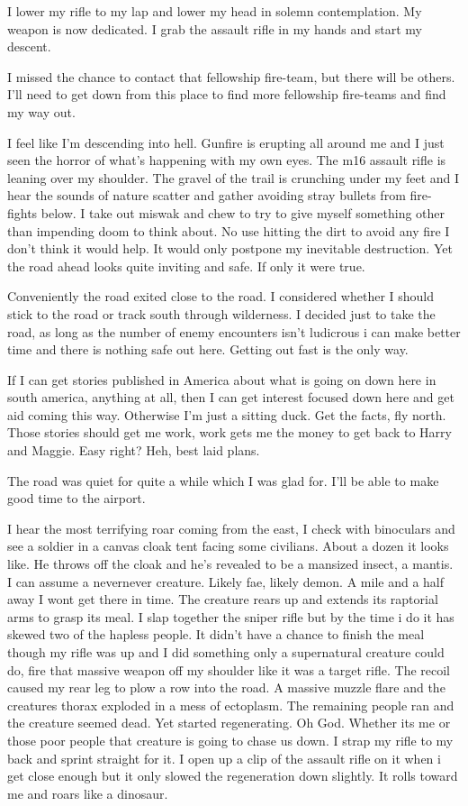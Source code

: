 I lower my rifle to my lap and lower my head in solemn contemplation. My weapon is now dedicated. I grab the assault rifle in my hands and start my descent.

I missed the chance to contact that fellowship fire-team, but there will be others. 
I'll need to get down from this place to find more fellowship fire-teams and find my way out.

I feel like I'm descending into hell. Gunfire is erupting all around me and I just seen the horror of what's happening with my own eyes. The m16 assault rifle is leaning over my shoulder. The gravel of the trail is crunching under my feet and I hear the sounds of nature scatter and gather avoiding stray bullets from fire-fights below. I take out miswak and chew to try to give myself something other than impending doom to think about. No use hitting the dirt to avoid any fire I don't think it would help. It would only postpone my inevitable destruction. Yet the road ahead looks quite inviting and safe. If only it were true.

Conveniently the road exited close to the road. I considered whether I should stick to the road or track south through wilderness. I decided just to take the road, as long as the number of enemy encounters isn't ludicrous i can make better time and there is nothing safe out here. Getting out fast is the only way.

If I can get stories published in America about what is going on down here in south america, anything at all, then I can get interest focused down here and get aid coming this way. Otherwise I'm just a  sitting duck. Get the facts, fly north. Those stories should get me work, work gets me the money to get back to Harry and Maggie. Easy right? Heh, best laid plans.

The road was quiet for quite a while which I was glad for. I'll be able to make good time to the airport.

I hear the most terrifying roar coming from the east, I check with binoculars and see a soldier in a canvas cloak tent facing some civilians. About a dozen it looks like. He throws off the cloak and he's revealed to be a mansized insect, a mantis. I can assume a nevernever creature. Likely fae, likely demon. A mile and a half away I wont get there in time. The creature rears up and extends its raptorial arms to grasp its meal. I slap together the sniper rifle but by the time i do it has skewed two of the hapless people. It didn't have a chance to finish the meal though my rifle was up and I did something only a supernatural creature could do, fire that massive weapon off my shoulder like it was a target rifle. The recoil caused my rear leg to plow a row into the road. A massive muzzle flare and the creatures thorax exploded in a mess of ectoplasm. The remaining people ran and the creature seemed dead. Yet started regenerating. Oh God. Whether its me or those poor people that creature is going to chase us down. I strap my rifle to my back and sprint straight for it. I open up a clip of the assault rifle on it when i get close enough but it only slowed the regeneration down slightly. It rolls toward me and roars like a dinosaur.

